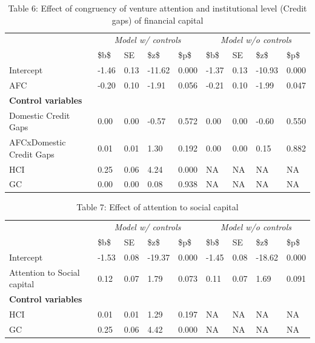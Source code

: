 \documentclass[
  english,
  man]{apa6}
\begin{document}
\begin{table}

\caption{\label{tab:unnamed-chunk-18}Table 6: Effect of congruency of venture attention and institutional level (Credit gaps) of financial capital}
\centering
\begin{tabular}[t]{l|l|l|l|l|l|l|l|l}
\hline
\multicolumn{1}{c|}{\em{ }} & \multicolumn{4}{c|}{\em{Model w/ controls}} & \multicolumn{4}{c}{\em{Model w/o controls}} \\
\cline{2-5} \cline{6-9}
  & \$b\$ & SE & \$z\$ & \$p\$ & \$b\$ & SE & \$z\$ & \$p\$\\
\hline
Intercept & -1.46 & 0.13 & -11.62 & 0.000 & -1.37 & 0.13 & -10.93 & 0.000\\
\hline
AFC & -0.20 & 0.10 & -1.91 & 0.056 & -0.21 & 0.10 & -1.99 & 0.047\\
\hline
\multicolumn{9}{l}{\textbf{Control variables}}\\
\hline
\hspace{1em}Domestic Credit Gaps & 0.00 & 0.00 & -0.57 & 0.572 & 0.00 & 0.00 & -0.60 & 0.550\\
\hline
\hspace{1em}AFCxDomestic Credit Gaps & 0.01 & 0.01 & 1.30 & 0.192 & 0.00 & 0.00 & 0.15 & 0.882\\
\hline
HCI & 0.25 & 0.06 & 4.24 & 0.000 & NA & NA & NA & NA\\
\hline
GC & 0.00 & 0.00 & 0.08 & 0.938 & NA & NA & NA & NA\\
\hline
\end{tabular}
\end{table}

\begin{table}

\caption{\label{tab:unnamed-chunk-18}Table 7: Effect of attention to social capital}
\centering
\begin{tabular}[t]{l|l|l|l|l|l|l|l|l}
\hline
\multicolumn{1}{c|}{\em{ }} & \multicolumn{4}{c|}{\em{Model w/ controls}} & \multicolumn{4}{c}{\em{Model w/o controls}} \\
\cline{2-5} \cline{6-9}
  & \$b\$ & SE & \$z\$ & \$p\$ & \$b\$ & SE & \$z\$ & \$p\$\\
\hline
Intercept & -1.53 & 0.08 & -19.37 & 0.000 & -1.45 & 0.08 & -18.62 & 0.000\\
\hline
Attention to Social capital & 0.12 & 0.07 & 1.79 & 0.073 & 0.11 & 0.07 & 1.69 & 0.091\\
\hline
\multicolumn{9}{l}{\textbf{Control variables}}\\
\hline
\hspace{1em}HCI & 0.01 & 0.01 & 1.29 & 0.197 & NA & NA & NA & NA\\
\hline
\hspace{1em}GC & 0.25 & 0.06 & 4.42 & 0.000 & NA & NA & NA & NA\\
\hline
\end{tabular}
\end{table}
\end{document}
